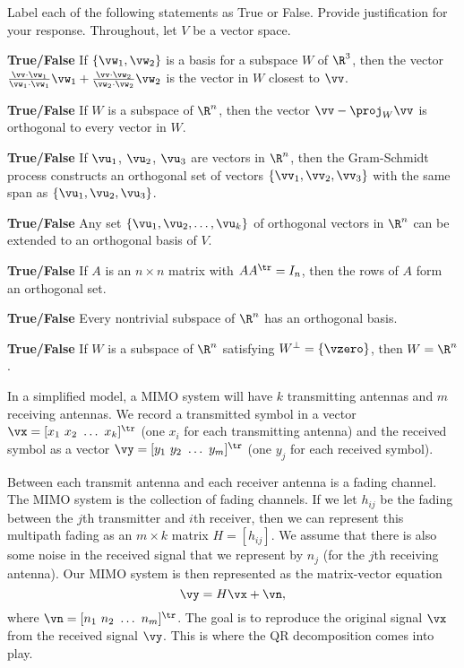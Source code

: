 \ea


\item Label each of the following statements as True or False. Provide justification for your response. Throughout, let $V$ be a vector space. 
	\ba
	\item \textbf{True/False} If $\{\vw_1, \vw_2\}$ is a basis for a subspace $W$ of $\R^3$, then the vector $\frac{\vv \cdot \vw_1}{\vw_1 \cdot \vw_1} \vw_1 + \frac{\vv \cdot \vw_2}{\vw_2 \cdot \vw_2}  \vw_2$ is the vector in $W$ closest to $\vv$. 
	\item \textbf{True/False}  If $W$ is a subspace of $\R^n$, then the vector $\vv - \proj_{W} \vv$ is orthogonal to every vector in $W$.
	\item \textbf{True/False} If $\vu_1$, $\vu_2$, $\vu_3$ are vectors in $\R^n$, then the Gram-Schmidt process constructs an orthogonal set of vectors $\{\vv_1, \vv_2, \vv_3\}$ with the same span as $\{\vu_1, \vu_2, \vu_3\}$. 
	\item \textbf{True/False} Any set $\{\vu_1, \vu_2, \ldots, \vu_k\}$ of orthogonal vectors in $\R^n$ can be extended to an orthogonal basis of $V$. 
	\item \textbf{True/False} If $A$ is an $n \times n$ matrix with $AA^{\tr} = I_n$, then the rows of $A$ form an orthogonal set. 
	\item \textbf{True/False} Every nontrivial subspace of $\R^n$ has an orthogonal basis. 
	\item \textbf{True/False} If $W$ is a subspace of $\R^n$ satisfying $W^\perp=\{\vzero\}$, then $W=\R^n$. 
	 \ea

\ee

\label{sec:project_mimo}

In a simplified model, a MIMO system will have $k$ transmitting antennas and $m$ receiving antennas. We record a transmitted symbol in a vector $\vx = [x_1 \ x_2 \ \ldots \ x_k]^{\tr}$ (one $x_i$ for each transmitting antenna) and the received symbol as a vector $\vy = [y_1 \ y_2 \ \ldots \ y_m]^{\tr}$ (one $y_j$ for each received symbol). 

Between each transmit antenna and each receiver antenna is a fading channel. The MIMO system is the collection of fading channels. If we let $h_{ij}$ be the fading between the $j$th transmitter and $i$th receiver, then we can represent this multipath fading as an $m \times k$ matrix $H = [h_{ij}]$. We assume that there is also some noise in the received signal that we represent by $n_j$ (for the $j$th receiving antenna). Our MIMO system is then represented as the matrix-vector equation
\[\vy = H\vx + \vn,\]
where $\vn = [n_1 \ n_2 \ \ldots \ n_m]^{\tr}$. The goal is to reproduce the original signal $\vx$ from the received signal $\vy$. This is where the QR decomposition comes into play. 

